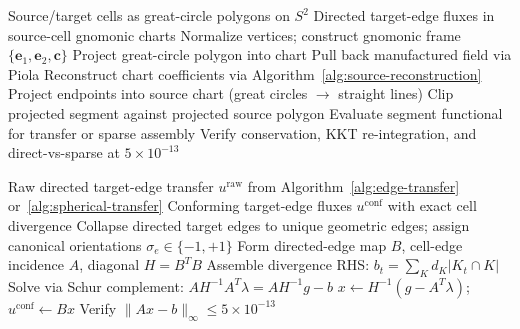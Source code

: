 \documentclass[11pt]{article}
\begin{document}
\begin{algorithm}[t]
\caption{Spherical Source-Chart Edge Transfer}
\label{alg:spherical-transfer}
\begin{algorithmic}[1]
\REQUIRE Source/target cells as great-circle polygons on \(S^2\)
\ENSURE  Directed target-edge fluxes in source-cell gnomonic charts
  \STATE Normalize vertices; construct gnomonic frame \(\{\mathbf{e}_1,\mathbf{e}_2,\mathbf{c}\}\)
  \STATE Project great-circle polygon into chart \hfill{}
  \STATE Pull back manufactured field via Piola \hfill{}
  \STATE Reconstruct chart coefficients via Algorithm~\ref{alg:source-reconstruction}
\ENDFOR
{}
    \STATE Project endpoints into source chart (great circles \(\to\) straight lines)
    \STATE Clip projected segment against projected source polygon
    \STATE Evaluate segment functional for transfer or sparse assembly
  \ENDFOR
\ENDFOR
\STATE Verify conservation, KKT re-integration, and direct-vs-sparse at \(5\times10^{-13}\)
\end{algorithmic}
\end{algorithm}

\begin{algorithm}[t]
\caption{Global \(H(\mathrm{div})\)-Conforming Target Projection}
\label{alg:hdiv-projection}
\begin{algorithmic}[1]
\REQUIRE Raw directed target-edge transfer \(u^{\mathrm{raw}}\) from Algorithm~\ref{alg:edge-transfer} or~\ref{alg:spherical-transfer}
\ENSURE  Conforming target-edge fluxes \(u^{\mathrm{conf}}\) with exact cell divergence
\STATE Collapse directed target edges to unique geometric edges; assign canonical orientations \(\sigma_e \in \{-1,+1\}\)
\STATE Form directed-edge map \(B\), cell-edge incidence \(A\), diagonal \(H = B^T B\)
\STATE Assemble divergence RHS: \(b_t = \sum_K d_K |K_t \cap K|\) \hfill{}
\STATE Solve via Schur complement: \(A H^{-1} A^T \lambda = A H^{-1} g - b\) \hfill{}
\STATE \(x \leftarrow H^{-1}(g - A^T \lambda)\); \quad \(u^{\mathrm{conf}} \leftarrow Bx\)
\STATE Verify \(\|Ax - b\|_\infty \le 5\times10^{-13}\)
\end{algorithmic}
\end{algorithm}
\end{document}

